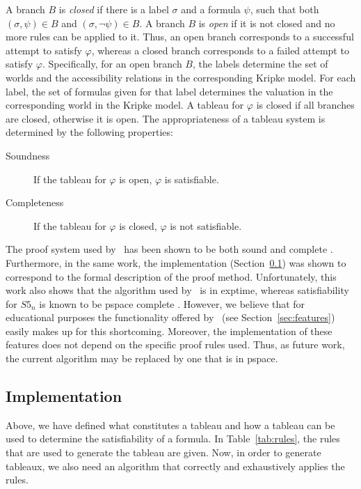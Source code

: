 A branch $B$ is {\em closed} if there is a label $\sigma$ and a formula
$\psi$, such that both $(\sigma, \psi) \in B$ and $(\sigma, \neg \psi)
\in B$. A branch $B$ is {\em open} if it is not closed and no more rules can be
applied to it. Thus, an open branch corresponds to a successful attempt to
satisfy $\varphi$, whereas a closed branch corresponds to a failed attempt to
satisfy $\varphi$. 
Specifically, for an open branch $B$, the labels determine the set of worlds
and the accessibility relations in the corresponding Kripke model. For each
label, the set of formulas given for that label determines the valuation in the
corresponding world in the Kripke model.
A tableau for $\varphi$ is closed if all branches are
closed, otherwise it is open. The appropriateness of a tableau system is
determined by the following properties:
\begin{description}
\item[Soundness] If the tableau for $\varphi$ is open, $\varphi$ is satisfiable.
\item[Completeness] If the tableau for $\varphi$ is closed, $\varphi$ is not
satisfiable.
\end{description}
The proof system used by \oops\ has been shown to be both sound and complete
\citep{valkenhoef2008}.  Furthermore, in the same work, the implementation
(Section~\ref{sec:implementation}) was
shown to correspond to the formal description of the proof method.
Unfortunately, this work also shows that the algorithm used by \oops\ is in
{\sc exptime}, whereas satisfiability for $S5_n$ is known to be {\sc pspace}
complete \citep{halpern1992}.
However, we believe that for educational purposes the functionality  offered
by \oops\ (see Section~\ref{sec:features}) easily makes up for this
shortcoming. Moreover, the implementation of these features does not depend on
the specific proof rules used. Thus, as future work, the current algorithm may
be replaced by one that is in {\sc pspace}.

\subsection{Implementation}
\label{sec:implementation}

Above, we have defined what constitutes a tableau and how a tableau can be used
to determine the satisfiability of a formula. In Table~\ref{tab:rules}, the
rules that are used to generate the tableau are given. Now, in order to
generate tableaux, we also need an algorithm that correctly and exhaustively
applies the rules.

